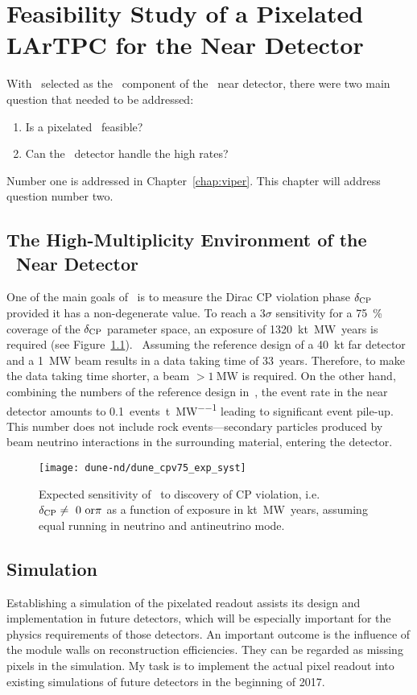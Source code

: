 \chapter{Feasibility Study of a Pixelated LArTPC for the \dune Near Detector}
\label{chap:dune-nd}

With \AC\ selected as  the \lar\ component of the \dune\ near detector, there were two main question that needed to be addressed:
\begin{enumerate}
	\item Is a pixelated \lartpc\ feasible?
	\item Can the \lar\ detector handle the high rates?
\end{enumerate}
Number one is addressed in Chapter~\ref{chap:viper}.
This chapter will address question number two.


\section{The High-Multiplicity Environment of the \dune\ Near Detector}
\label{sec:dune-nd_multiplicity}

One of the main goals of \dune\ is to measure the Dirac CP violation phase $\delta_{\mathrm{CP}}$ provided it has a non-degenerate value.
To reach a $3 \sigma$ sensitivity for a \SI{75}{\percent} coverage of the $\delta_{\mathrm{CP}}$ parameter space, an exposure of \SI{1320}{\kilo\tonne\mega\watt years} is required (see Figure~\ref{fig:dune-nd_cpv-sens}).~\cite{dune2}
Assuming the reference design of a \SI{40}{\kilo\tonne} far detector and a \SI{1}{\mega\watt} beam results in a data taking time of \SI{33}{years}.
Therefore, to make the data taking time shorter, a beam $>\SI{1}{\mega\watt}$ is required.
On the other hand, combining the numbers of the reference design in~\cite{dune2}, the event rate in the near detector amounts to \SI{0.1}{events\per\tonne\per\mega\watt} leading to significant event pile-up.
This number does not include rock events---secondary particles produced by beam neutrino interactions in the surrounding material, entering the detector.

\begin{figure}[htb]
	\centering
	\texttt{[image: dune-nd/dune\_cpv75\_exp\_syst]}
	\caption{Expected sensitivity of \dune\ to discovery of CP violation, i.e.\ $\delta_{\mathrm{CP}} \neq\ 0\ \mathrm{or} \pi$ as a function of exposure in \si{\kilo\tonne\mega\watt years}, assuming equal running in neutrino and antineutrino mode.~\cite{dune2}}
	\label{fig:dune-nd_cpv-sens}
\end{figure}

\section{Simulation}
\label{sec:dune-nd_simulation}

Establishing a simulation of the pixelated readout assists its design and implementation in future detectors, which will be especially important for the physics requirements of those detectors.
An important outcome is the influence of the module walls on reconstruction efficiencies.
They can be regarded as missing pixels in the simulation.
My task is to implement the actual pixel readout into existing simulations of future detectors in the beginning of 2017.
